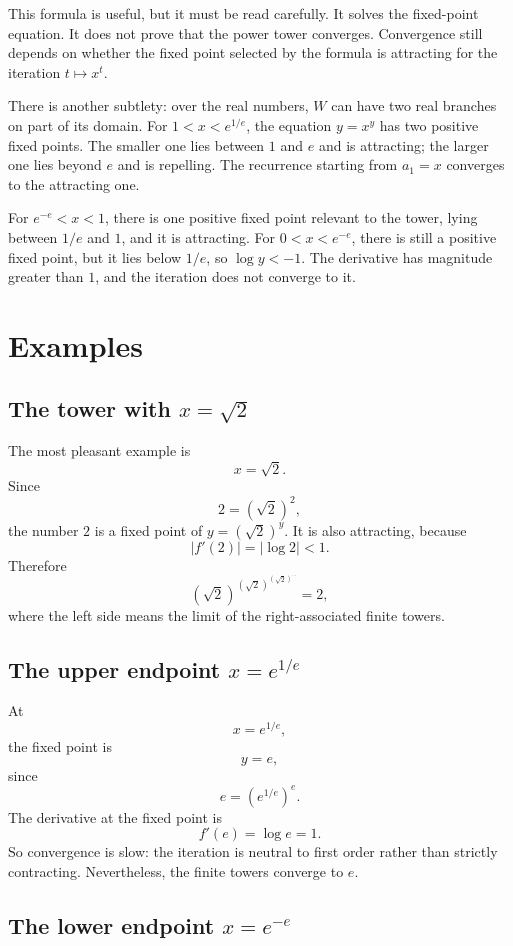 \documentclass{essay}
\begin{document}
This formula is useful, but it must be read carefully. It solves the
fixed-point equation. It does not prove that the power tower converges.
Convergence still depends on whether the fixed point selected by the formula
is attracting for the iteration \(t\mapsto x^t\).

There is another subtlety: over the real numbers, \(W\) can have two real
branches on part of its domain. For \(1<x<e^{1/e}\), the equation \(y=x^y\)
has two positive fixed points. The smaller one lies between \(1\) and \(e\)
and is attracting; the larger one lies beyond \(e\) and is repelling. The
recurrence starting from \(a_1=x\) converges to the attracting one.

For \(e^{-e}<x<1\), there is one positive fixed point relevant to the tower,
lying between \(1/e\) and \(1\), and it is attracting. For \(0<x<e^{-e}\),
there is still a positive fixed point, but it lies below \(1/e\), so
\(\log y<-1\). The derivative has magnitude greater than \(1\), and the
iteration does not converge to it.

\section{Examples}

\subsection*{The tower with \(x=\sqrt2\)}

The most pleasant example is
\[
  x=\sqrt2.
\]
Since
\[
  2=(\sqrt2)^2,
\]
the number \(2\) is a fixed point of \(y=(\sqrt2)^y\). It is also attracting,
because
\[
  |f'(2)|=|\log 2|<1.
\]
Therefore
\[
  \left(\sqrt2\right)^{\left(\sqrt2\right)^{\left(\sqrt2\right)^{\cdots}}}=2,
\]
where the left side means the limit of the right-associated finite towers.

\subsection*{The upper endpoint \(x=e^{1/e}\)}

At
\[
  x=e^{1/e},
\]
the fixed point is
\[
  y=e,
\]
since
\[
  e=(e^{1/e})^e.
\]
The derivative at the fixed point is
\[
  f'(e)=\log e=1.
\]
So convergence is slow: the iteration is neutral to first order rather than
strictly contracting. Nevertheless, the finite towers converge to \(e\).

\subsection*{The lower endpoint \(x=e^{-e}\)}
\end{document}
